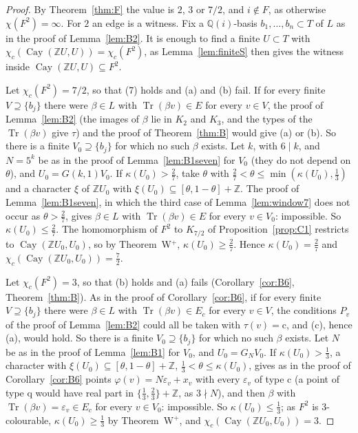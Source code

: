 \documentclass[11pt,a4paper]{amsart}
\theoremstyle{remark}
\newcommand{\Q}{\mathbb{Q}}
\newcommand{\Z}{\mathbb{Z}}
\newcommand{\Cay}{\operatorname{Cay}}
\newcommand{\Tr}{\operatorname{Tr}}
\begin{document}
\begin{proof}
By Theorem~\ref{thm:F} the value is $2$, $3$ or $7/2$, and $i\notin F$, as otherwise $\chi(F^2)=\infty$. For $2$ an
edge is a witness. Fix a $\Q(i)$-basis $b_1,\dots,b_n\subset T$ of $L$ as in the proof of Lemma~\ref{lem:B2}. It is
enough to find a finite $U\subset T$ with $\chi_c(\Cay(\Z U,U))=\chi_c(F^2)$, as Lemma~\ref{lem:finiteS} then gives
the witness inside $\Cay(\Z U,U)\subseteq F^2$.

Let $\chi_c(F^2)=7/2$, so that (7) holds and (a) and (b) fail. If for every finite $V\supseteq\{b_j\}$ there were
$\beta\in L$ with $\Tr(\beta v)\in E$ for every $v\in V$, the proof of Lemma~\ref{lem:B2} (the images of $\beta$ lie
in $K_2$ and $K_3$, and the types of the $\Tr(\beta v)$ give $\tau$) and the proof of Theorem~\ref{thm:B} would give
(a) or (b). So there is a finite $V_0\supseteq\{b_j\}$ for which no such $\beta$ exists. Let $k$, with $6\mid k$, and
$N=5^k$ be as in the proof of Lemma~\ref{lem:B1seven} for $V_0$ (they do not depend on $\theta$), and
$U_0=G(k,1)V_0$. If $\kappa(U_0)>\frac27$, take $\theta$ with $\frac27<\theta\le\min(\kappa(U_0),\frac13)$ and a
character $\xi$ of $\Z U_0$ with $\xi(U_0)\subseteq[\theta,1-\theta]+\Z$. The proof of Lemma~\ref{lem:B1seven}, in
which the third case of Lemma~\ref{lem:window7} does not occur as $\theta>\frac27$, gives $\beta\in L$ with
$\Tr(\beta v)\in E$ for every $v\in V_0$: impossible. So $\kappa(U_0)\le\frac27$. The homomorphism of $F^2$ to
$K_{7/2}$ of Proposition~\ref{prop:C1} restricts to $\Cay(\Z U_0,U_0)$, so by Theorem~W$^+$, $\kappa(U_0)\ge\frac27$.
Hence $\kappa(U_0)=\frac27$ and $\chi_c(\Cay(\Z U_0,U_0))=\frac72$.

Let $\chi_c(F^2)=3$, so that (b) holds and (a) fails (Corollary~\ref{cor:B6}, Theorem~\ref{thm:B}). As in the proof
of Corollary~\ref{cor:B6}, if for every finite $V\supseteq\{b_j\}$ there were $\beta\in L$ with $\Tr(\beta v)\in E_c$
for every $v\in V$, the conditions $P_v$ of the proof of Lemma~\ref{lem:B2} could all be taken with $\tau(v)=\mathrm
c$, and (c), hence (a), would hold. So there is a finite $V_0\supseteq\{b_j\}$ for which no such $\beta$ exists. Let
$N$ be as in the proof of Lemma~\ref{lem:B1} for $V_0$, and $U_0=G_NV_0$. If $\kappa(U_0)>\frac13$, a character with
$\xi(U_0)\subseteq[\theta,1-\theta]+\Z$, $\frac13<\theta\le\kappa(U_0)$, gives as in the proof of
Corollary~\ref{cor:B6} points $\varphi(v)=N\varepsilon_v+x_v$ with every $\varepsilon_v$ of type c (a point of type q
would have real part in $\{\frac13,\frac23\}+\Z$, as $3\nmid N$), and then $\beta$ with $\Tr(\beta v)=\varepsilon_v
\in E_c$ for every $v\in V_0$: impossible. So $\kappa(U_0)\le\frac13$; as $F^2$ is $3$-colourable, $\kappa(U_0)\ge
\frac13$ by Theorem~W$^+$, and $\chi_c(\Cay(\Z U_0,U_0))=3$.
\end{proof}
\end{document}
